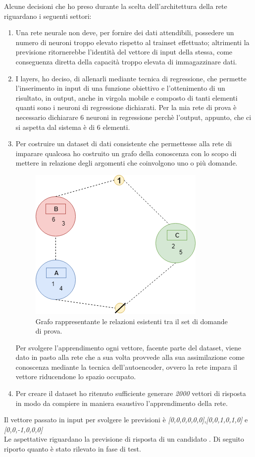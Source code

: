 Alcune decisioni che ho preso durante la scelta dell'architettura della rete riguardano i seguenti settori:
\begin{enumerate}
\item Una rete neurale non deve, per fornire dei dati attendibili, possedere un numero di neuroni troppo elevato rispetto al trainset effettuato; altrimenti la previsione  ritornerebbe l'identit\`a del vettore di input della stessa, come conseguenza diretta della capacit\`a troppo elevata di immagazzinare dati.
\item I layers, ho deciso, di allenarli mediante tecnica di regressione, che permette l'inserimento in input di una funzione obiettivo e l'ottenimento di un risultato, in output, anche in virgola mobile e composto di tanti elementi quanti sono i neuroni di regressione dichiarati. Per la mia rete di prova \`e necessario dichiarare  6 neuroni in regressione perch\`e l'output, appunto, che ci si aspetta dal sistema \`e di 6 elementi.
\item Per costruire un dataset di dati consistente che permettesse alla rete di imparare qualcosa ho costruito un grafo della conoscenza con lo scopo di mettere in relazione degli argomenti che coinvolgono uno o pi\`u domande.
\begin{figure}[H]
\centering
	\includegraphics[width=0.60\linewidth]{./image/grafo_trainset.png}
	\caption{Grafo rappresentante le relazioni esistenti tra il set di domande di prova.}
\end{figure}
\noindent
Per svolgere l'apprendimento ogni vettore, facente parte del dataset, viene dato in pasto alla rete che a sua volta provvede alla sua assimilazione come conoscenza mediante la tecnica dell'autoencoder, ovvero la rete impara il vettore riducendone lo spazio occupato.
\item Per creare il dataset ho ritenuto sufficiente generare \textit{2000} vettori di risposta in modo da compiere in maniera esaustivo l'apprendimento della rete.
\end{enumerate}
\noindent
Il vettore passato in input per svolgere le previsioni \`e \textit{[0,0,0,0,0,0]},\textit{[0,0,1,0,1,0]} e \textit{[0,0,-1,0,0,0]}\\
Le aspettative riguardano la previsione di risposta di un candidato
\noindent. 
Di seguito riporto quanto \`e stato rilevato in fase di test.

